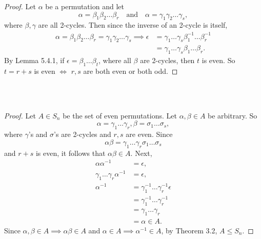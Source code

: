 \documentclass{article}
\newtheorem{theorem}{Theorem}[section]
\theoremstyle{definition}
\newtheorem{definition}{Definition}[section]
\begin{document}
 \begin{proof}
     Let $\alpha$ be a permutation and let
    \begin{equation*}
        \alpha = \beta_1\beta_2\dots\beta_r \quad \text{and} \quad \alpha = \gamma_1\gamma_2\dots\gamma_s,
    \end{equation*}
    where $\beta,\gamma$ are all 2-cycles. Then since the inverse of an 2-cycle is itself,
    \begin{align*}
        \alpha = \beta_1\beta_2\dots\beta_r = \gamma_1\gamma_2\dots\gamma_s \implies \epsilon &= \gamma_1\dots\gamma_s\beta_1^{-1}\dots\beta_r^{-1} \\
        &= \gamma_1\dots\gamma_s\beta_1\dots\beta_r.
    \end{align*}
    By Lemma 5.4.1, if $\epsilon = \beta_1\dots\beta_t$, where all $\beta$ are  2-cycles, then $t$ is even. So $t=r+s$ is even $\iff$ $r,s$ are both even or both odd. 
 \end{proof}
 
 \noindent{}
 \\ \\
 
 \begin{proof}
     Let $A \in S_n$ be the set of even permutations. Let $\alpha,\beta \in A$ be arbitrary. So
     \begin{equation*}
         \alpha = \gamma_1\dots\gamma_r, \beta = \sigma_1\dots\sigma_s,
     \end{equation*}
     where $\gamma$'s and $\sigma$'s are 2-cycles and $r,s$ are even. Since
     \begin{equation*}
         \alpha\beta = \gamma_1\dots\gamma_r\sigma_1\dots\sigma_s
     \end{equation*}
     and $r+s$ is even, it follows that $\alpha\beta \in A$. Next,
     \begin{align*}
         \alpha\alpha^{-1} &= \epsilon, \\
         \gamma_1\dots\gamma_r\alpha^{-1} &= \epsilon, \\
         \alpha^{-1} &= \gamma_1^{-1}\dots\gamma_r^{-1}\epsilon \\
         &= \gamma_1^{-1}\dots\gamma_r^{-1} \\
         &= \gamma_1\dots\gamma_r \\
         &= \alpha \in A.
     \end{align*}
     Since $\alpha,\beta \in A \implies \alpha\beta \in A$ and $\alpha \in A \implies \alpha^{-1} \in A$, by Theorem 3.2, $A \leq S_n$.
 \end{proof}
 
\end{document}

